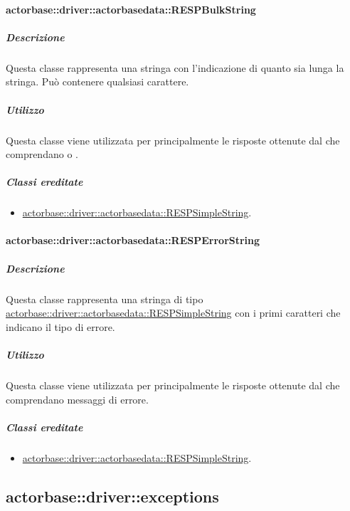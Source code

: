 \documentclass{scalatekids-article}
\begin{document}
\paragraph{actorbase::driver::actorbasedata::RESPBulkString}
\label{sec:actorbase::driver::actorbasedata::RESPBulkString}

\subparagraph{Descrizione}

Questa classe rappresenta una stringa con l'indicazione di quanto sia lunga la
stringa. Può contenere qualsiasi carattere.

\subparagraph{Utilizzo}

Questa classe viene utilizzata per  principalmente le
risposte ottenute dal  che comprendano  o
.

\subparagraph{Classi ereditate}

\begin{itemize}
\item \hyperref[sec:actorbase::driver::actorbasedata::RESPSimpleString]{actorbase::driver::actorbasedata::RESPSimpleString}.
\end{itemize}

\paragraph{actorbase::driver::actorbasedata::RESPErrorString}
\label{sec:actorbase::driver::actorbasedata::RESPErrorString}

\subparagraph{Descrizione}

Questa classe rappresenta una stringa di tipo \hyperref[sec:actorbase::driver::actorbasedata::RESPSimpleString]{actorbase::driver::actorbasedata::RESPSimpleString}
con i primi caratteri che indicano il tipo di errore.

\subparagraph{Utilizzo}

Questa classe viene utilizzata per  principalmente le
risposte ottenute dal  che comprendano messaggi di errore.

\subparagraph{Classi ereditate}

\begin{itemize}
\item \hyperref[sec:actorbase::driver::actorbasedata::RESPSimpleString]{actorbase::driver::actorbasedata::RESPSimpleString}.
\end{itemize}


\subsection{actorbase::driver::exceptions}
\label{sec:actorbase::driver::eceptions}
\end{document}
